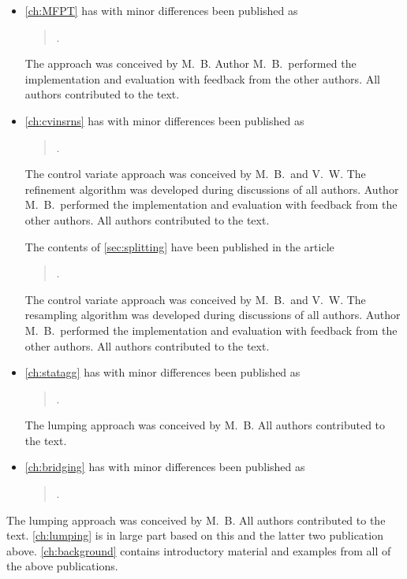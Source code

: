 \begin{itemize}

\item \autoref{ch:MFPT} has with minor differences been published as
\begin{quote}
    .
\end{quote}
The approach was conceived by M.\ B.
Author M.\ B.\ performed the implementation and evaluation with feedback from the other authors.
All authors contributed to the text.

\item \autoref{ch:cvinsrns} has with minor differences been published as
\begin{quote}
    .
\end{quote}
The control variate approach was conceived by M.\ B.\ and V.\ W. The refinement algorithm was developed during discussions of all authors.
Author M.\ B.\ performed the implementation and evaluation with feedback from the other authors.
All authors contributed to the text.

The contents of \autoref{sec:splitting} have been published in the article
\begin{quote}
    .
\end{quote}
The control variate approach was conceived by M.\ B.\ and V.\ W. The resampling algorithm was developed during discussions of all authors.
Author M.\ B.\ performed the implementation and evaluation with feedback from the other authors.
All authors contributed to the text.

\item \autoref{ch:statagg} has with minor differences been published as
\begin{quote}
    .
\end{quote}
The lumping approach was conceived by M.\ B.
All authors contributed to the text.

\item \autoref{ch:bridging} has with minor differences been published as
\begin{quote}
    .
\end{quote}
\end{itemize}
The lumping approach was conceived by M.\ B.
All authors contributed to the text.
\autoref{ch:lumping} is in large part based on this and the latter two publication above.
\autoref{ch:background} contains introductory material and examples from all of the above publications.


% 


